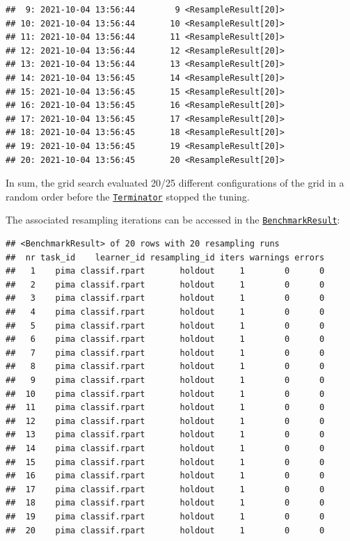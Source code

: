 \documentclass[
]{scrbook}
\newenvironment{Shaded}{\begin{snugshade}}{\end{snugshade}}
\newcommand{\NormalTok}[1]{#1}
\newcommand{\SpecialCharTok}[1]{\textcolor[rgb]{0.00,0.00,0.00}{#1}}
\renewenvironment{Shaded} {\begin{snugshade}\small} {\end{snugshade}}
\begin{document}
\begin{verbatim}
##  9: 2021-10-04 13:56:44        9 <ResampleResult[20]>
## 10: 2021-10-04 13:56:44       10 <ResampleResult[20]>
## 11: 2021-10-04 13:56:44       11 <ResampleResult[20]>
## 12: 2021-10-04 13:56:44       12 <ResampleResult[20]>
## 13: 2021-10-04 13:56:44       13 <ResampleResult[20]>
## 14: 2021-10-04 13:56:45       14 <ResampleResult[20]>
## 15: 2021-10-04 13:56:45       15 <ResampleResult[20]>
## 16: 2021-10-04 13:56:45       16 <ResampleResult[20]>
## 17: 2021-10-04 13:56:45       17 <ResampleResult[20]>
## 18: 2021-10-04 13:56:45       18 <ResampleResult[20]>
## 19: 2021-10-04 13:56:45       19 <ResampleResult[20]>
## 20: 2021-10-04 13:56:45       20 <ResampleResult[20]>
\end{verbatim}

In sum, the grid search evaluated 20/25 different configurations of the grid in a random order before the \href{https://bbotk.mlr-org.com/reference/Terminator.html}{\texttt{Terminator}} stopped the tuning.

The associated resampling iterations can be accessed in the \href{https://mlr3.mlr-org.com/reference/BenchmarkResult.html}{\texttt{BenchmarkResult}}:

\begin{Shaded}
\end{Shaded}

\begin{verbatim}
## <BenchmarkResult> of 20 rows with 20 resampling runs
##  nr task_id    learner_id resampling_id iters warnings errors
##   1    pima classif.rpart       holdout     1        0      0
##   2    pima classif.rpart       holdout     1        0      0
##   3    pima classif.rpart       holdout     1        0      0
##   4    pima classif.rpart       holdout     1        0      0
##   5    pima classif.rpart       holdout     1        0      0
##   6    pima classif.rpart       holdout     1        0      0
##   7    pima classif.rpart       holdout     1        0      0
##   8    pima classif.rpart       holdout     1        0      0
##   9    pima classif.rpart       holdout     1        0      0
##  10    pima classif.rpart       holdout     1        0      0
##  11    pima classif.rpart       holdout     1        0      0
##  12    pima classif.rpart       holdout     1        0      0
##  13    pima classif.rpart       holdout     1        0      0
##  14    pima classif.rpart       holdout     1        0      0
##  15    pima classif.rpart       holdout     1        0      0
##  16    pima classif.rpart       holdout     1        0      0
##  17    pima classif.rpart       holdout     1        0      0
##  18    pima classif.rpart       holdout     1        0      0
##  19    pima classif.rpart       holdout     1        0      0
##  20    pima classif.rpart       holdout     1        0      0
\end{verbatim}
\end{document}
